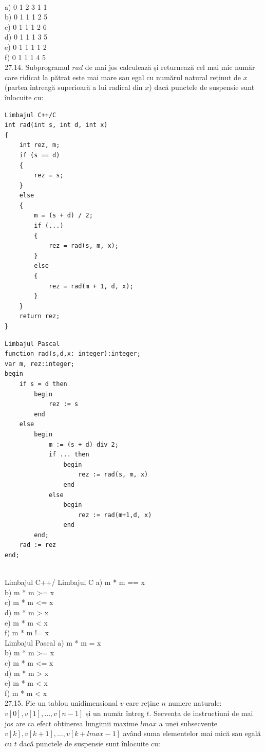 \\
a) 0 1 2 3 1 1
\\
b) 0 1 1 1 2 5
\\
c) 0 1 1 1 2 6
\\
d) 0 1 1 1 3 5
\\
e) 0 1 1 1 1 2
\\
f) 0 1 1 1 4 5
\\
27.14. Subprogramul $rad$ de mai jos calculează și returnează cel mai mic număr care ridicat la pătrat este mai mare sau egal cu numărul natural reținut de $x$ (partea întreagă superioară a lui radical din $x$) dacă punctele de suspensie sunt înlocuite cu:
\begin{verbatim}
Limbajul C++/C
int rad(int s, int d, int x)
{
    int rez, m;
    if (s == d)
    {
        rez = s;
    }
    else
    {
        m = (s + d) / 2;
        if (...)
        {
            rez = rad(s, m, x);
        }
        else
        {
            rez = rad(m + 1, d, x);
        }
    }
    return rez;
}
\end{verbatim}
\begin{verbatim}
Limbajul Pascal
function rad(s,d,x: integer):integer;
var m, rez:integer;
begin
    if s = d then
        begin
            rez := s
        end
    else
        begin
            m := (s + d) div 2;
            if ... then
                begin
                    rez := rad(s, m, x)
                end
            else
                begin
                    rez := rad(m+1,d, x)
                end
        end;
    rad := rez
end;
\end{verbatim}
\\
Limbajul C++/ Limbajul C
a) m * m == x
\\
b) m * m >= x
\\
c) m * m <= x
\\
d) m * m > x
\\
e) m * m < x
\\
f) m * m != x
\\
Limbajul Pascal
a) m * m = x
\\
b) m * m >= x
\\
c) m * m <= x
\\
d) m * m > x
\\
e) m * m < x
\\
f) m * m < x
\\
27.15. Fie un tablou unidimensional $v$ care reține $n$ numere naturale: $v[0], v[1], \ldots, v[n-1]$ și un număr întreg $t$. Secvența de instrucțiuni de mai jos are ca efect obținerea lungimii maxime $lmax$ a unei subsecvențe $v[k], v[k+1], \ldots, v[k+lmax-1]$ având suma elementelor mai mică sau egală cu $t$ dacă punctele de suspensie sunt înlocuite cu:
